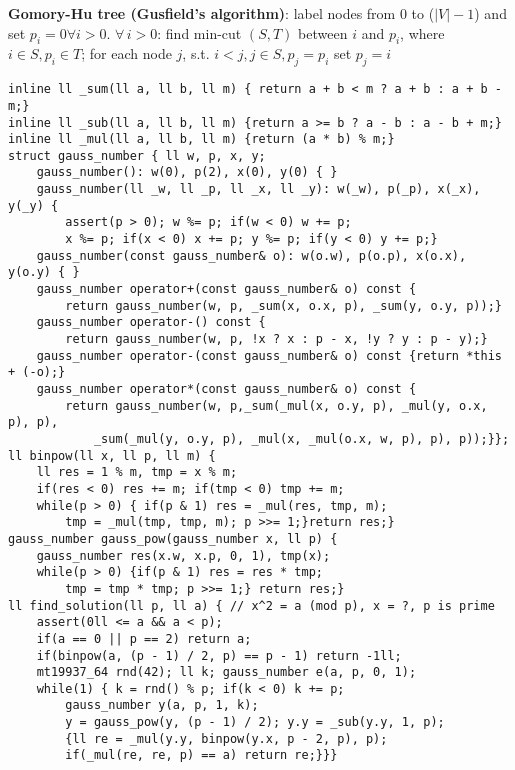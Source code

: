 \documentclass[12pt]{article}
\begin{document}
{\bf Gomory-Hu tree (Gusfield’s algorithm)}: label nodes from $0$ to ($|V| - 1$) and 
set $p_i=0 \forall i > 0$. $\forall\,i > 0$: find min-cut $(S, T)$ 
between $i$ and $p_i$, where $i \in S, p_i \in T$; 
for each node $j$, s.t. $i < j, j \in S, p_j=p_i$ set $p_j = i$

\begin{verbatim}
inline ll _sum(ll a, ll b, ll m) { return a + b < m ? a + b : a + b - m;}
inline ll _sub(ll a, ll b, ll m) {return a >= b ? a - b : a - b + m;}
inline ll _mul(ll a, ll b, ll m) {return (a * b) % m;}
struct gauss_number { ll w, p, x, y;
    gauss_number(): w(0), p(2), x(0), y(0) { }
    gauss_number(ll _w, ll _p, ll _x, ll _y): w(_w), p(_p), x(_x), y(_y) {
        assert(p > 0); w %= p; if(w < 0) w += p; 
        x %= p; if(x < 0) x += p; y %= p; if(y < 0) y += p;}
    gauss_number(const gauss_number& o): w(o.w), p(o.p), x(o.x), y(o.y) { }
    gauss_number operator+(const gauss_number& o) const {
        return gauss_number(w, p, _sum(x, o.x, p), _sum(y, o.y, p));}
    gauss_number operator-() const {
        return gauss_number(w, p, !x ? x : p - x, !y ? y : p - y);}
    gauss_number operator-(const gauss_number& o) const {return *this + (-o);}
    gauss_number operator*(const gauss_number& o) const {
        return gauss_number(w, p,_sum(_mul(x, o.y, p), _mul(y, o.x, p), p),
            _sum(_mul(y, o.y, p), _mul(x, _mul(o.x, w, p), p), p));}};
ll binpow(ll x, ll p, ll m) {
    ll res = 1 % m, tmp = x % m;
    if(res < 0) res += m; if(tmp < 0) tmp += m;
    while(p > 0) { if(p & 1) res = _mul(res, tmp, m);
        tmp = _mul(tmp, tmp, m); p >>= 1;}return res;}
gauss_number gauss_pow(gauss_number x, ll p) {
    gauss_number res(x.w, x.p, 0, 1), tmp(x);
    while(p > 0) {if(p & 1) res = res * tmp;
        tmp = tmp * tmp; p >>= 1;} return res;}
ll find_solution(ll p, ll a) { // x^2 = a (mod p), x = ?, p is prime
    assert(0ll <= a && a < p);
    if(a == 0 || p == 2) return a;
    if(binpow(a, (p - 1) / 2, p) == p - 1) return -1ll;
    mt19937_64 rnd(42); ll k; gauss_number e(a, p, 0, 1);
    while(1) { k = rnd() % p; if(k < 0) k += p;
        gauss_number y(a, p, 1, k);
        y = gauss_pow(y, (p - 1) / 2); y.y = _sub(y.y, 1, p);
        {ll re = _mul(y.y, binpow(y.x, p - 2, p), p);
        if(_mul(re, re, p) == a) return re;}}}
\end{verbatim}
\end{document}
